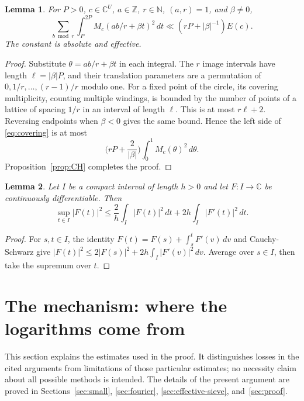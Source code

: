 \documentclass[11pt]{amsart}
\numberwithin{equation}{section}
\numberwithin{figure}{section}
\newtheorem{lemma}{Lemma}[section]
\theoremstyle{definition}
\newcommand{\Z}{\mathbb{Z}}
\newcommand{\C}{\mathbb{C}}
\newcommand{\N}{\mathbb{N}}
\begin{document}
\begin{lemma}\label{lem:covering}
For $P>0$, $c\in\C^U$, $a\in\Z$, $r\in\N$, $(a,r)=1$, and
$\beta\ne0$,
\begin{equation}\label{eq:covering}
 \sum_{b\bmod r}\int_P^{2P}M_c(ab/r+\beta t)^2\,dt
 \ll (rP+|\beta|^{-1})E(c).
\end{equation}
The constant is absolute and effective.
\end{lemma}

\begin{proof}
Substitute $\theta=ab/r+\beta t$ in each integral. The $r$ image
intervals have length $\ell=|\beta|P$, and their translation parameters
are a permutation of $0,1/r,\ldots,(r-1)/r$ modulo one.
For a fixed point of the circle, its covering multiplicity, counting
multiple windings, is bounded by the number of points of a lattice of
spacing $1/r$ in an interval of length $\ell$. This is at most
$r\ell+2$. Reversing endpoints when $\beta<0$ gives the same bound.
Hence the left side of \eqref{eq:covering} is at most
\[
 \Big(rP+\frac2{|\beta|}\Big)\int_0^1M_c(\theta)^2\,d\theta.
\]
Proposition~\ref{prop:CH} completes the proof.
\end{proof}

\begin{lemma}\label{lem:variation}
Let $I$ be a compact interval of length $h>0$ and let $F:I\to\C$
be continuously differentiable. Then
\begin{equation}\label{eq:interval-variation}
 \sup_{t\in I}|F(t)|^2
 \le\frac2h\int_I|F(t)|^2\,dt
       +2h\int_I|F'(t)|^2\,dt.
\end{equation}
\end{lemma}

\begin{proof}
For $s,t\in I$, the identity $F(t)=F(s)+\int_s^tF'(v)\,dv$
and Cauchy-Schwarz give
$|F(t)|^2\le2|F(s)|^2+2h\int_I|F'(v)|^2\,dv$.
Average over $s\in I$, then take the supremum over $t$.
\end{proof}

\section{The mechanism: where the logarithms come from}\label{sec:mechanism}

This section explains the estimates used in the proof. It distinguishes
losses in the cited arguments from limitations of those particular
estimates; no necessity claim about all possible methods is intended.
The details of the present argument are proved in
Sections~\ref{sec:small}, \ref{sec:fourier},
\ref{sec:effective-sieve}, and~\ref{sec:proof}.
\end{document}
